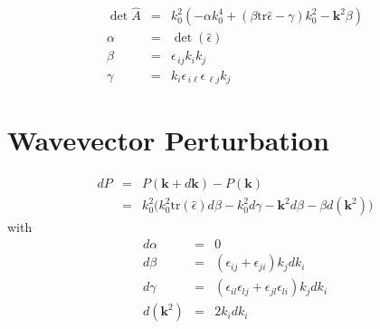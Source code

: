 \documentclass[12pt,a4paper,twoside,openright,BCOR10mm,headsepline,titlepage,abstracton,chapterprefix,final]{scrreprt}
\newcommand\Vector[1]{{\mathbf{#1}}}
\newcommand\wavenumber{k}
\newcommand\Wavevector{\Vector{\wavenumber}}
\newcommand\Tensor[1]{\hat{#1}}
\newcommand\scalarrelativepermittivity{\epsilon}
\newcommand\relativepermittivity{\Tensor{\scalarrelativepermittivity}}
\begin{document}
\begin{eqnarray}
 \det \hat{A}  &=& k_0^2 \left( -\alpha k_0^4 +  (\beta \text{tr}\relativepermittivity - \gamma) k_0^2 - \Vector{k}^2 \beta \right) \\
 \alpha &=& \det(\relativepermittivity) \\
 \beta &=& \scalarrelativepermittivity_{\,ij} k_i k_j \\
 \gamma &=& k_i \scalarrelativepermittivity_{\,i\ell} \scalarrelativepermittivity_{\,\ell j} k_j
\end{eqnarray}

\section{Wavevector Perturbation}

\begin{eqnarray}
 dP &=& P(\Wavevector + d\Wavevector) - P(\Wavevector) \\
    &=& \wavenumber_0^2 \bigg( \wavenumber_0^2 \text{tr}(\relativepermittivity) d\beta - \wavenumber_0^2 d\gamma - \Wavevector^2 d\beta - \beta d(\Wavevector^2) \bigg) 
\end{eqnarray}
with
\begin{eqnarray}
 d\alpha &=& 0 \\
 d\beta &=& (\scalarrelativepermittivity_{ij} + \scalarrelativepermittivity_{ji}) \wavenumber_j d\wavenumber_i\\
 d\gamma &=& (\scalarrelativepermittivity_{il}\scalarrelativepermittivity_{lj} + \scalarrelativepermittivity_{jl}\scalarrelativepermittivity_{li}) \wavenumber_j d\wavenumber_i\\
 d(\Wavevector^2) &=& 2 \wavenumber_i d\wavenumber_i
\end{eqnarray}
\end{document}
